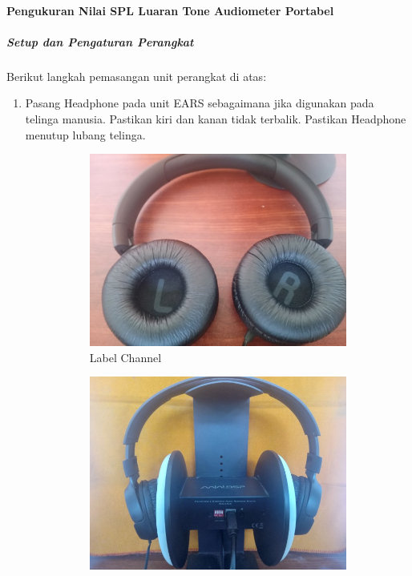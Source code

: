 \documentclass{article}
\begin{document}
	\paragraph{Pengukuran Nilai SPL Luaran Tone Audiometer Portabel}
	\subparagraph{Setup dan Pengaturan Perangkat}
		Berikut langkah pemasangan unit perangkat di atas:
		
		\begin{enumerate}
			\item Pasang Headphone pada unit EARS sebagaimana jika digunakan pada telinga manusia.
			Pastikan kiri dan kanan tidak terbalik.
			Pastikan Headphone menutup lubang telinga.
			
			\begin{figure}[H]
				\centering
				\begin{subfigure}[t]{0.35\textwidth}
					\includegraphics[width=\textwidth]{images/pasang/chjbl}
					\caption{Label Channel}
				\end{subfigure}
				\begin{subfigure}[t]{0.35\textwidth}
					\includegraphics[width=\textwidth]{images/pasang/pasangjbl}

\end{subfigure}
\end{figure}
\end{enumerate}
\end{document}
